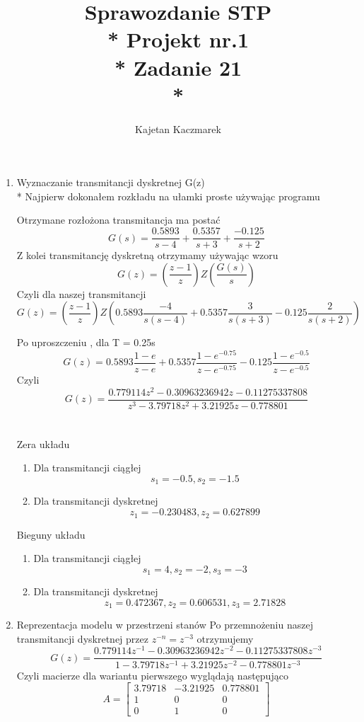 \documentclass[a4paper, 11pt]{article}
\author{Kajetan Kaczmarek}
\begin{document}
\title{Sprawozdanie STP \\* Projekt nr.1 \\* 
Zadanie 21 \\*}
\maketitle

\begin{enumerate}
\item Wyznaczanie transmitancji dyskretnej G(z) \\*
Najpierw dokonałem rozkładu na ułamki proste używając programu



Otrzymane rozłożona transmitancja ma postać \[ G(s) = \dfrac{0.5893}{s-4} + \dfrac{0.5357}{s+3} +\dfrac{-0.125}{s+2} \]
Z kolei transmitancję dyskretną otrzymamy używając wzoru \[G(z) = (\dfrac{z-1}{z})Z(\dfrac{G(s)}{s}) \] Czyli dla naszej transmitancji
 \[G(z) = (\dfrac{z-1}{z})Z(0.5893\dfrac{-4}{s(s - 4)} + 0.5357\dfrac{3}{s(s + 3)} - 0.125\dfrac{2}{s(s + 2)} ) \] 
 
 Po uproszczeniu , dla T = 0.25s
  \[G(z) = 0.5893\dfrac{1-e}{z - e} + 0.5357\dfrac{1-e^{-0.75}}{z - e^{-0.75}} - 0.125\dfrac{1-e^{-0.5}}{z - e^{-0.5}}  \] 
  Czyli
  \[G(z) = \dfrac{0.779114z^2 - 0.30963236942z - 0.11275337808 }{z^3 - 3.79718 z^2 + 3.21925 z - 0.778801} \]\\
  \\
Zera układu
\begin{enumerate}
\item Dla transmitancji ciągłej \[ s_1 = -0.5 , s_2 = -1.5 \]
\item Dla transmitancji dyskretnej \[ z_1 = -0.230483 , z_2 = 0.627899\]
\end{enumerate}
Bieguny układu

\begin{enumerate}
\item Dla transmitancji ciągłej \[ s_1 = 4 , s_2 = -2 , s_3 = -3\]
\item Dla transmitancji dyskretnej \[ z_1 = 0.472367 , z_2 = 0.606531 , z_3 = 2.71828\]
\end{enumerate}
\item Reprezentacja modelu w przestrzeni stanów
Po przemnożeniu naszej transmitancji dyskretnej przez \( z^{-n} = z^{-3}\)
otrzymujemy
  \[G(z) = \dfrac{0.779114z^{-1} - 0.30963236942z^{-2} - 0.11275337808z^{-3} }{1 - 3.79718 z^{-1} + 3.21925 z^{-2} - 0.778801z^{-3}} \]
  Czyli macierze dla wariantu pierwszego wyglądają następująco
 \[ A = 	
 \begin{bmatrix}
   3.79718 & -3.21925 & 0.778801\\
   1 & 0 & 0\\
   0 & 1 & 0
  \end{bmatrix}
\]


\end{enumerate}
\end{document}
